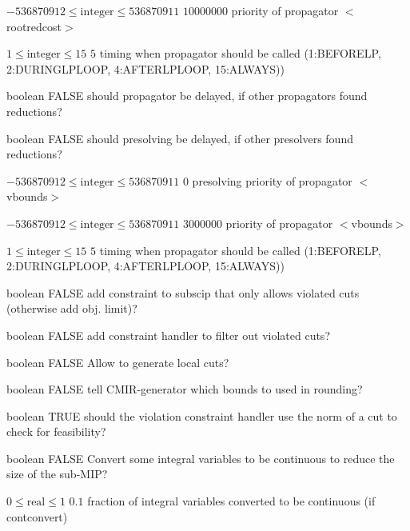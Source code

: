 %
{$-536870912\leq\textrm{integer}\leq536870911$}%
{$10000000$}%
{priority of propagator $<$rootredcost$>$}%
{}

%
{$1\leq\textrm{integer}\leq15$}%
{$5$}%
{timing when propagator should be called (1:BEFORELP, 2:DURINGLPLOOP, 4:AFTERLPLOOP, 15:ALWAYS))}%
{}

%
{boolean}%
{FALSE}%
{should propagator be delayed, if other propagators found reductions?}%
{}

%
{boolean}%
{FALSE}%
{should presolving be delayed, if other presolvers found reductions?}%
{}

%
{$-536870912\leq\textrm{integer}\leq536870911$}%
{$0$}%
{presolving priority of propagator $<$vbounds$>$}%
{}

%
{$-536870912\leq\textrm{integer}\leq536870911$}%
{$3000000$}%
{priority of propagator $<$vbounds$>$}%
{}

%
{$1\leq\textrm{integer}\leq15$}%
{$5$}%
{timing when propagator should be called (1:BEFORELP, 2:DURINGLPLOOP, 4:AFTERLPLOOP, 15:ALWAYS))}%
{}

%
{boolean}%
{FALSE}%
{add constraint to subscip that only allows violated cuts (otherwise add obj. limit)?}%
{}

%
{boolean}%
{FALSE}%
{add constraint handler to filter out violated cuts?}%
{}

%
{boolean}%
{FALSE}%
{Allow to generate local cuts?}%
{}

%
{boolean}%
{FALSE}%
{tell CMIR-generator which bounds to used in rounding?}%
{}

%
{boolean}%
{TRUE}%
{should the violation constraint handler use the norm of a cut to check for feasibility?}%
{}

%
{boolean}%
{FALSE}%
{Convert some integral variables to be continuous to reduce the size of the sub-MIP?}%
{}

%
{$0\leq\textrm{real}\leq1$}%
{$0.1$}%
{fraction of integral variables converted to be continuous (if contconvert)}%
{}

